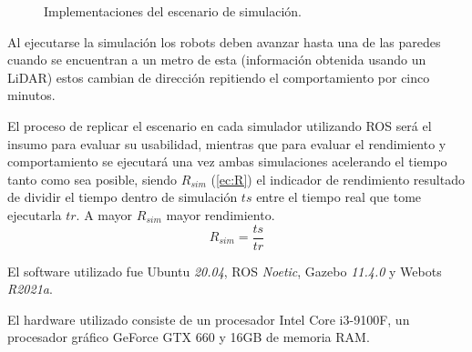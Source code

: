 \begin{figure}[H]
  \centering
  \qquad
  \caption{Implementaciones del escenario de simulación.}\label{fig:impsim}
\end{figure}

Al ejecutarse la simulación los robots deben avanzar hasta una de las paredes
cuando se encuentran a un metro de esta (información obtenida usando un LiDAR) %
estos cambian de dirección repitiendo el comportamiento por cinco minutos.

El proceso de replicar el escenario en cada simulador utilizando ROS será el
insumo para evaluar su usabilidad, mientras que para evaluar el rendimiento y
comportamiento se ejecutará una vez ambas simulaciones acelerando el tiempo
tanto como sea posible, siendo $R_{sim}$ (\ref{ec:R}) el indicador de
rendimiento resultado de dividir el tiempo dentro de simulación $ts$ entre el
tiempo real que tome ejecutarla $tr$. A mayor $R_{sim}$ mayor rendimiento.
\begin{equation}\label{ec:R} R_{sim} = \frac{ts}{tr} \end{equation}

El software utilizado fue Ubuntu \emph{20.04}, ROS \emph{Noetic}, Gazebo \emph{11.4.0} y Webots \emph{R2021a}. 

El hardware utilizado consiste de un procesador Intel Core i3-9100F, un procesador
gráfico GeForce GTX 660 y 16GB de memoria RAM.

